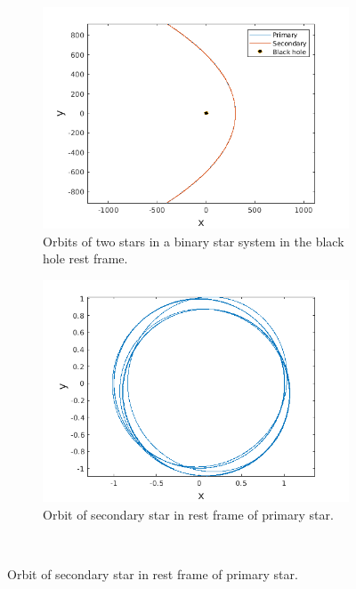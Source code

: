 \documentclass[a4paper]{article}
\begin{document}
			
			\begin{figure} [h]
				\begin{subfigure} {.5\columnwidth}
					\includegraphics[width=\columnwidth]{../plots/3a_orbits_equalaxes.png}
					\caption{Orbits of two stars in a binary star system in the black hole rest frame.}
					\label{fig:3a}
				\end{subfigure}
				\hfill
				\begin{subfigure} {.5\columnwidth}
					\includegraphics[width=\columnwidth]{../plots/3b_secondaryorbit.png}
					\caption{Orbit of secondary star in rest frame of primary star.}
					\label{fig:3b}
				\end{subfigure}\\
				

\end{figure}
\end{document}
